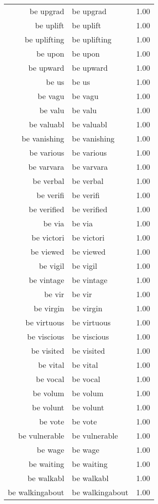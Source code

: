 \begin{table}[ht]
\begin{tabular}{rlr}
  be upgrad & be upgrad & 1.00 \\ 
  be uplift & be uplift & 1.00 \\ 
  be uplifting & be uplifting & 1.00 \\ 
  be upon & be upon & 1.00 \\ 
  be upward & be upward & 1.00 \\ 
  be us & be us & 1.00 \\ 
  be vagu & be vagu & 1.00 \\ 
  be valu & be valu & 1.00 \\ 
  be valuabl & be valuabl & 1.00 \\ 
  be vanishing & be vanishing & 1.00 \\ 
  be various & be various & 1.00 \\ 
  be varvara & be varvara & 1.00 \\ 
  be verbal & be verbal & 1.00 \\ 
  be verifi & be verifi & 1.00 \\ 
  be verified & be verified & 1.00 \\ 
  be via & be via & 1.00 \\ 
  be victori & be victori & 1.00 \\ 
  be viewed & be viewed & 1.00 \\ 
  be vigil & be vigil & 1.00 \\ 
  be vintage & be vintage & 1.00 \\ 
  be vir & be vir & 1.00 \\ 
  be virgin & be virgin & 1.00 \\ 
  be virtuous & be virtuous & 1.00 \\ 
  be viscious & be viscious & 1.00 \\ 
  be visited & be visited & 1.00 \\ 
  be vital & be vital & 1.00 \\ 
  be vocal & be vocal & 1.00 \\ 
  be volum & be volum & 1.00 \\ 
  be volunt & be volunt & 1.00 \\ 
  be vote & be vote & 1.00 \\ 
  be vulnerable & be vulnerable & 1.00 \\ 
  be wage & be wage & 1.00 \\ 
  be waiting & be waiting & 1.00 \\ 
  be walkabl & be walkabl & 1.00 \\ 
  be walkingabout & be walkingabout & 1.00 \\ 

\end{tabular}
\end{table}
